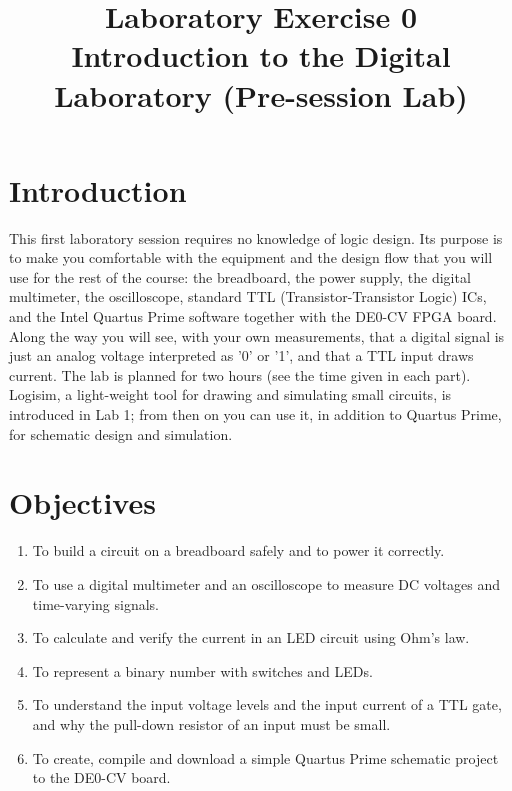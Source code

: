 \documentclass{article}
\title{Laboratory Exercise 0 \\ Introduction to the Digital Laboratory (Pre-session Lab)}
\author{}
\date{}
\begin{document}
\maketitle

\section*{Introduction}
This first laboratory session requires no knowledge of logic design. Its purpose is to make you comfortable with the equipment and the design flow that you will use for the rest of the course: the breadboard, the power supply, the digital multimeter, the oscilloscope, standard TTL (Transistor-Transistor Logic) ICs, and the Intel Quartus Prime software together with the DE0-CV FPGA board. Along the way you will see, with your own measurements, that a digital signal is just an analog voltage interpreted as '0' or '1', and that a TTL input draws current. The lab is planned for two hours (see the time given in each part). Logisim, a light-weight tool for drawing and simulating small circuits, is introduced in Lab 1; from then on you can use it, in addition to Quartus Prime, for schematic design and simulation.

\section*{Objectives}
\begin{enumerate}
    \item To build a circuit on a breadboard safely and to power it correctly.
    \item To use a digital multimeter and an oscilloscope to measure DC voltages and time-varying signals.
    \item To calculate and verify the current in an LED circuit using Ohm's law.
    \item To represent a binary number with switches and LEDs.
    \item To understand the input voltage levels and the input current of a TTL gate, and why the pull-down resistor of an input must be small.
    \item To create, compile and download a simple Quartus Prime schematic project to the DE0-CV board.
\end{enumerate}
\end{document}

